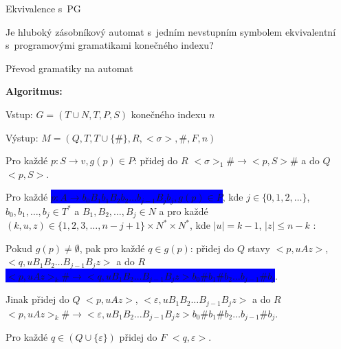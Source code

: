 \documentclass[a4paper,fyma3]{prosper}
\theoremstyle{definition}
\begin{document}
\begin{slide}{Ekvivalence s~PG}
\bigskip
\bigskip


Je hluboký zásobníkový automat s~jedním nevstupním symbolem ekvivalentní s~programovými gramatikami konečného indexu?
\medskip

\end{slide}

\begin{slide}{Převod gramatiky na automat}
\begin{list}{}{\setlength\parsep{0cm} \setlength\itemsep{0cm} \setlength\leftmargin{1em}}
\item \textbf{Algoritmus:} \medskip
  \item Vstup: $G = (T \cup N ,T,P,S)$ konečného indexu $n$
  \item Výstup: $M = (Q, T, T \cup \{\#\}, R, <\sigma>, \# , F, n)$ \medskip

  \item Pro každé $p: S \rightarrow v, g(p) \in P$:
  \subitem přidej do $R$ $<\sigma>_1 \# \rightarrow <p, S> \#$ a do $Q$ $<p, S>$.\medskip

  \item Pro každé \colorbox{blue}{\black $p: A \rightarrow b_0 B_1 b_1 B_2 b_2 \dots b_{j-1} B_{j} b_j, g(p) \in P$}, kde $j \in \{0,1,2,\dots\}$, $b_0,b_1,\dots,b_j \in T^*$ a $B_1,B_2,\dots,B_j \in N$ a pro každé $(k,u,z) \in \{1,2,3,\dots,n-j+1\} \times N^* \times N^*$, kde $|u| = k-1$, $|z|  \le n-k$ : \medskip

  \subitem Pokud $g(p) \ne \emptyset$, pak pro každé $q \in g(p)$:
  \subitem přidej do $Q$ stavy $<p,uAz>$, $<q, u B_1 B_2 \dots B_{j-1} B_{j} z>$ a do $R$
  \subitem  \colorbox{blue}{\black$<p,uAz>_k \# \rightarrow <q, u B_1 B_2 \dots B_{j-1} B_{j} z> b_0 \# b_1 \# b_2 \dots b_{j-1} \# b_j$}.  \medskip

  \subitem Jinak přidej do $Q$ $<p,uAz>$, $<\varepsilon, u B_1 B_2 \dots B_{j-1} B_{j} z>$ a do $R$ 
\subitem $<p,uAz>_k \# \rightarrow <\varepsilon, u B_1 B_2 \dots B_{j-1} B_{j} z> b_0 \# b_1 \# b_2 \dots b_{j-1} \# b_j$.\medskip


  \item Pro každé $q \in (Q \cup \{\varepsilon\})$ přidej do $F$ $<q, \varepsilon>$.

\end{list}

\end{slide}
\end{document}

